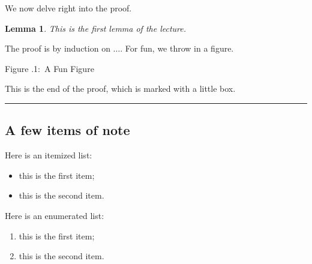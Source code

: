 \documentclass[twoside]{article}
\newcounter{lecnum}
\newcommand{\fig}[3]{
			\vspace{#2}
			\begin{center}
			Figure \thelecnum.#1:~#3
			\end{center}
	}
\newtheorem{lemma}[theorem]{Lemma}
\newenvironment{proof}{{\bf Proof:}}{\hfill\rule{2mm}{2mm}}
\begin{document}




















We now delve right into the proof.

\begin{lemma}
This is the first lemma of the lecture.
\end{lemma}

\begin{proof}
The proof is by induction on $\ldots$.
For fun, we throw in a figure.
\fig{1}{1in}{A Fun Figure}

This is the end of the proof, which is marked with a little box.
\end{proof}

\subsection{A few items of note}

Here is an itemized list:
\begin{itemize}
\item this is the first item;
\item this is the second item.
\end{itemize}

Here is an enumerated list:
\begin{enumerate}
\item this is the first item;
\item this is the second item.
\end{enumerate}
\end{document}
